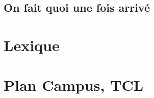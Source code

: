 \begin{multicols}{2}
    \subsection{On fait quoi une fois arrivé}
    
    \clearpage
\section{Lexique}

\clearpage
\section{Plan Campus, TCL}
\end{multicols}

